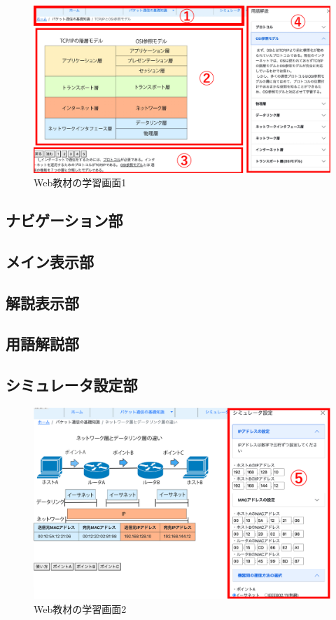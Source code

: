 \documentclass[12pt,a4j,titlepage]{ltjsarticle}
\begin{document}
\begin{figure}[h]
\begin{center}
 \includegraphics[clip,width=150mm]{figures/gamen.pdf}
\end{center}
 \caption{Web教材の学習画面1}
 \label{fig:画面}
\end{figure}

\subsection{ナビゲーション部}
\subsection{メイン表示部}
\subsection{解説表示部}
\subsection{用語解説部}
\subsection{シミュレータ設定部}
\begin{figure}[h]
\begin{center}
 \includegraphics[clip,width=150mm]{figures/gamen2.pdf}
\end{center}
 \caption{Web教材の学習画面2}
 \label{fig:画面2}
\end{figure}
\clearpage
\end{document}
